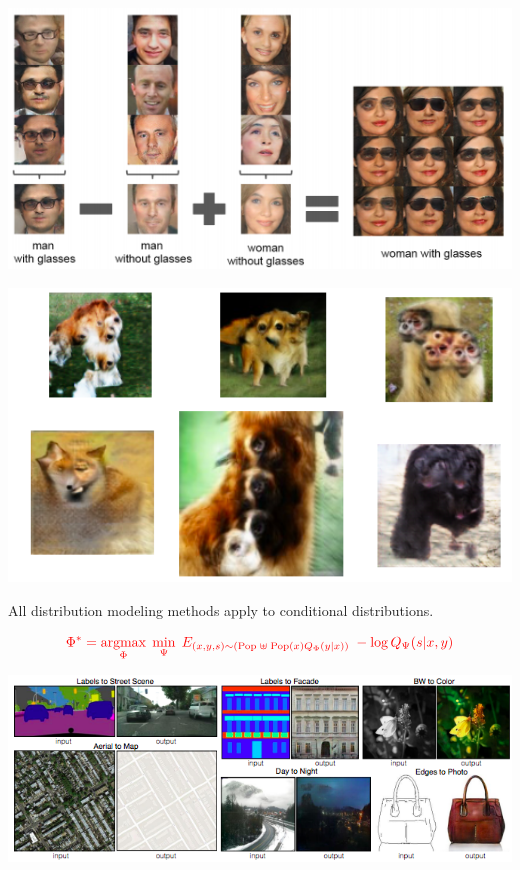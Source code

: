 {

\centerline{\includegraphics[width = 9in]{../images/ImageFeatures}}


\centerline{\includegraphics[width = 9in]{../images/BadGAN}}



All distribution modeling methods apply to conditional distributions.

$${\color{red} \Phi^* = \operatorname*{argmax}_\Phi \; \min_\Psi \;E_{(x,y,s) \sim (\mathrm{Pop}\; \uplus \;\mathrm{Pop}(x)Q_\Phi(y|x))}\;-\log Q_\Psi(s|x,y)}$$


\centerline{\includegraphics[width = 8.0in]{../images/cGAN0}}

}
